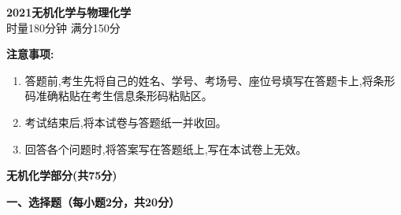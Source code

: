 \begin{center}
    {\LARGE \textbf{2021无机化学与物理化学}} \\[2ex]
    {\large 时量180分钟 \quad 满分150分}
\end{center}

\vspace{0.5cm}
\noindent\textbf{注意事项:}
\begin{enumerate}[label=\arabic*., parsep=0pt, itemsep=0pt]
    \item 答题前,考生先将自己的姓名、学号、考场号、座位号填写在答题卡上,将条形码准确粘贴在考生信息条形码粘贴区。
    \item 考试结束后,将本试卷与答题纸一并收回。
    \item 回答各个问题时,将答案写在答题纸上,写在本试卷上无效。
\end{enumerate}

\vspace{1cm}
\begin{center}
    {\Large \textbf{无机化学部分(共75分)}}
\end{center}

\vspace{0.5cm}
\noindent\textbf{一、选择题（每小题2分，共20分）}

